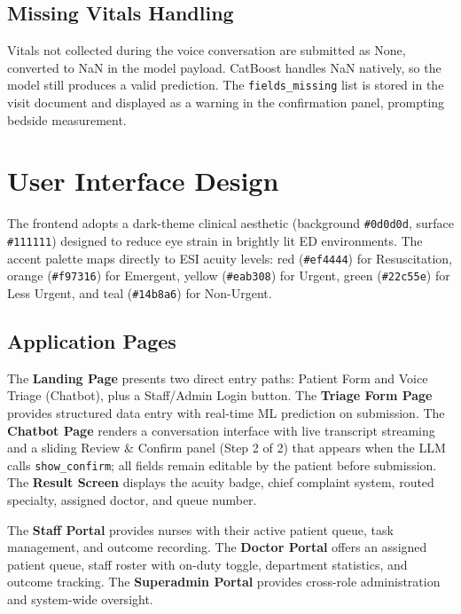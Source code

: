 \documentclass[conference]{IEEEtran}
\begin{document}
\subsection{Missing Vitals Handling}
Vitals not collected during the voice conversation are submitted as None, converted to NaN in the model payload. CatBoost handles NaN natively, so the model still produces a valid prediction. The \texttt{fields\_missing} list is stored in the visit document and displayed as a warning in the confirmation panel, prompting bedside measurement.

\section{User Interface Design}

The frontend adopts a dark-theme clinical aesthetic (background \texttt{\#0d0d0d}, surface \texttt{\#111111}) designed to reduce eye strain in brightly lit ED environments. The accent palette maps directly to ESI acuity levels: red (\texttt{\#ef4444}) for Resuscitation, orange (\texttt{\#f97316}) for Emergent, yellow (\texttt{\#eab308}) for Urgent, green (\texttt{\#22c55e}) for Less Urgent, and teal (\texttt{\#14b8a6}) for Non-Urgent.

\subsection{Application Pages}
The \textbf{Landing Page} presents two direct entry paths: Patient Form and Voice Triage (Chatbot), plus a Staff/Admin Login button. The \textbf{Triage Form Page} provides structured data entry with real-time ML prediction on submission. The \textbf{Chatbot Page} renders a conversation interface with live transcript streaming and a sliding Review \& Confirm panel (Step 2 of 2) that appears when the LLM calls \texttt{show\_confirm}; all fields remain editable by the patient before submission. The \textbf{Result Screen} displays the acuity badge, chief complaint system, routed specialty, assigned doctor, and queue number.

The \textbf{Staff Portal} provides nurses with their active patient queue, task management, and outcome recording. The \textbf{Doctor Portal} offers an assigned patient queue, staff roster with on-duty toggle, department statistics, and outcome tracking. The \textbf{Superadmin Portal} provides cross-role administration and system-wide oversight.
\end{document}
